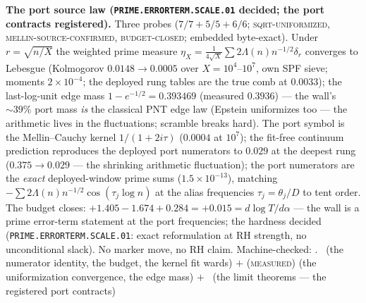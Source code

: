 \par\smallskip\noindent\textbf{The port source law
(\texttt{PRIME.ERRORTERM.\allowbreak SCALE.01} decided; the
port contracts registered).}
Three probes ($7/7 + 5/5 + 6/6$; \textsc{sqrt-uniformized},
\textsc{mellin-source-confirmed}, \textsc{budget-closed};
embedded byte-exact).  Under $r = \sqrt{n/X}$ the weighted prime
measure $\eta_X = \tfrac{1}{4\sqrt X}\sum 2\Lambda(n)n^{-1/2}
\delta_r$ converges to Lebesgue (Kolmogorov $0.0148 \to 0.0005$
over $X = 10^4$--$10^7$, own SPF sieve; moments $2\times10^{-4}$;
the deployed rung tables are the true comb at $0.0033$); the
last-log-unit edge mass $1 - e^{-1/2} = 0.393469$ (measured
$0.3936$) --- the wall's ${\sim}39\%$ port mass \emph{is} the
classical PNT edge law (Epstein uniformizes too --- the
arithmetic lives in the fluctuations; scramble breaks hard).  The
port symbol is the Mellin--Cauchy kernel $1/(1 + 2i\tau)$
($0.0004$ at $10^7$); the fit-free continuum prediction
reproduces the deployed port numerators to $0.029$ at the deepest
rung ($0.375 \to 0.029$ --- the shrinking arithmetic
fluctuation); the port numerators are the \emph{exact}
deployed-window prime sums ($1.5\times10^{-13}$), matching
$-\sum 2\Lambda(n)n^{-1/2}\cos(\tau_j\log n)$ at the alias
frequencies $\tau_j = \theta_j/D$ to tent order.  The budget
closes: $+1.405 - 1.674 + 0.284 = +0.015 = d\log T/d\alpha$ ---
the wall is a prime error-term statement at the port
frequencies; the hardness decided
(\texttt{PRIME.ERRORTERM.SCALE.01}: exact reformulation at RH
strength, no unconditional slack).  No marker move, no RH claim.
Machine-checked: .
\mE\ (the numerator identity, the budget, the kernel fit wards)
$+$ (\textsc{measured}) (the uniformization convergence, the
edge mass) $+$ \mO\ (the limit theorems --- the registered
port contracts)
\par\smallskip


